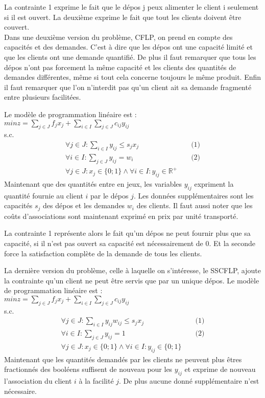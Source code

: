 \documentclass[12pt,a4paper]{article}
\begin{document}
La contrainte 1 exprime le fait que le dépos j peux alimenter le client i seulement si il est ouvert. La deuxième exprime le fait que tout les clients doivent être couvert.\\

Dans une deuxième version du problème, CFLP, on prend en compte des capacités et des demandes. C'est à dire que les dépos ont une capacité limité et que les clients ont une demande quantifié. De plus il faut remarquer que tous les dépos n'ont pas forcement la même capacité et les clients des quantités de demandes différentes, même si tout cela concerne toujours le même produit. Enfin il faut remarquer que l'on n'interdit pas qu'un client ait sa demande fragmenté entre plusieurs facilitées.

Le modèle de programmation linéaire est :\\
$min z = \sum \limits_{j \in J} f_j x_j + \sum \limits_{i \in I} \sum \limits_{j \in J} c_{ij} y_{ij}$\\
s.c.
\begin{align*}
 \forall j \in J : \sum \limits_{i \in I} y_{ij} \leqslant s_j x_j & & \text{ (1)} \\
 \forall i \in I : \sum \limits_{j \in J} y_{ij} = w_i & & \text{ (2)}\\
 \forall j \in J : x_j \in \{0;1\} \land \forall i \in I : y_{ij} \in \mathbb{R}^{+} 
\end{align*}
Maintenant que des quantités entre en jeux, les variables $y_{ij}$ expriment la quantité fournie au client $i$ par le dépos $j$. Les données supplémentaires sont les capacités $s_j$ des dépos et les demandes $w_i$ des clients. Il faut aussi noter que les coûts d'associations sont maintenant exprimé en prix par unité transporté.

La contrainte 1 représente alors le fait qu'un dépos ne peut fournir plus que sa capacité, si il n'est pas ouvert sa capacité est nécessairement de 0. Et la seconde force la satisfaction complète de la demande de tous les clients.

La dernière version du problème, celle à laquelle on s'intéresse, le SSCFLP, ajoute la contrainte qu'un client ne peut être servis que par un unique dépos.
Le modèle de programmation linéaire est :\\
$min z = \sum \limits_{j \in J} f_j x_j + \sum \limits_{i \in I} \sum \limits_{j \in J} c_{ij} y_{ij}$\\
s.c.
\begin{align*}
 \forall j \in J : \sum \limits_{i \in I} y_{ij} w_{ij} \leqslant s_j x_j & & \text{ (1)} \\
 \forall i \in I : \sum \limits_{j \in J} y_{ij} = 1 & & \text{ (2)} \\
 \forall j \in J : x_j \in \{0;1\} \land \forall i \in I : y_{ij} \in \{0;1\}
\end{align*}
Maintenant que les quantités demandés par les clients ne peuvent plus êtres fractionnés des booléens suffisent de nouveau pour les $y_{ij}$ et exprime de nouveau l'association du client $i$ à la facilité $j$. De plus aucune donné supplémentaire n'est nécessaire.
\end{document}
